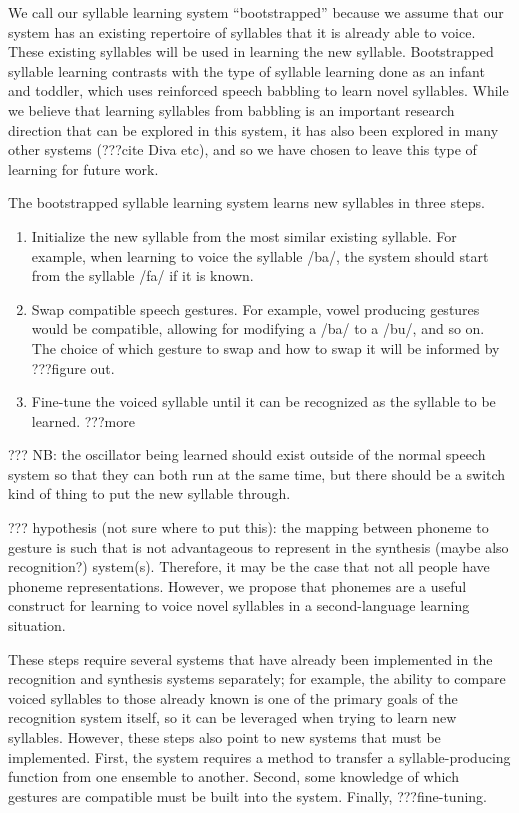 We call our syllable learning system ``bootstrapped''
because we assume that our system
has an existing repertoire of syllables
that it is already able to voice.
These existing syllables will be
used in learning the new syllable.
Bootstrapped syllable learning contrasts with
the type of syllable learning
done as an infant and toddler,
which uses reinforced speech babbling
to learn novel syllables.
While we believe that learning syllables
from babbling is an important research direction
that can be explored in this system,
it has also been explored in many other systems
(???cite Diva etc),
and so we have chosen to leave this type of learning
for future work.

The bootstrapped syllable learning system
learns new syllables in three steps.

\begin{enumerate}
\item Initialize the new syllable from the most
  similar existing syllable.
  For example, when learning to voice
  the syllable /ba/, the system should
  start from the syllable /fa/ if it is known.
\item Swap compatible speech gestures.
  For example, vowel producing gestures
  would be compatible, allowing for modifying
  a /ba/ to a /bu/, and so on.
  The choice of which gesture to swap and
  how to swap it will be informed by
  ???figure out.
\item Fine-tune the voiced syllable
  until it can be recognized as the
  syllable to be learned.
  ???more
\end{enumerate}

??? NB: the oscillator being learned should exist outside of
the normal speech system so that they can both run
at the same time, but there should be a switch kind of thing
to put the new syllable through.

??? hypothesis (not sure where to put this):
the mapping between phoneme to gesture
is such that is not advantageous
to represent in the synthesis
(maybe also recognition?) system(s).
Therefore, it may be the case that
not all people have phoneme representations.
However, we propose that phonemes
are a useful construct for learning to voice
novel syllables in a second-language learning situation.

These steps require several systems
that have already been implemented
in the recognition and synthesis systems separately;
for example, the ability to compare
voiced syllables to those already known
is one of the primary goals of the recognition system itself,
so it can be leveraged when trying to learn new syllables.
However, these steps also point to new systems
that must be implemented.
First, the system requires a method
to transfer a syllable-producing function
from one ensemble to another.
Second, some knowledge of which gestures
are compatible must be built into the system.
Finally, ???fine-tuning.

